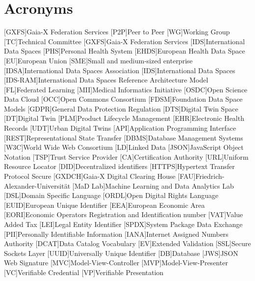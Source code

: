 \chapter{Acronyms}
\begin{acronym}
    [GXFS]{Gaia-X Federation Services}
    [P2P]{Peer to Peer}
    [WG]{Working Group}
    [TC]{Technical Committee}
    [GXFS]{Gaia-X Federation Services}
    [IDS]{International Data Spaces}
    [PHS]{Personal Health System}
    [EHDS]{European Health Data Space}
    [EU]{European Union}
    [SME]{Small and medium-sized enterprise}
    [IDSA]{International Data Spaces Association}
    [IDS]{International Data Spaces}
    [IDS-RAM]{International Data Spaces Reference Architecture Model}
    [FL]{Federated Learning}
    [MII]{Medical Informatics Initiative}
    [OSDC]{Open Science Data Cloud}
    [OCC]{Open Commons Consortium}
    [FDSM]{Foundation Data Space Models}
    [GDPR]{General Data Protection Regulation}
    [DTS]{Digital Twin Space}
    [DT]{Digital Twin}
    [PLM]{Product Lifecycle Management}
    [EHR]{Electronic Health Records}
    [UDT]{Urban Digital Twins}
    [API]{Application Programming Interface}
    [REST]{Representational State Transfer}
    [DBMS]{Database Management Systems}
    [W3C]{World Wide Web Consortium}
    [LD]{Linked Data}
    [JSON]{JavaScript Object Notation}
    [TSP]{Trust Service Provider}
    [CA]{Certification Authority}
    [URL]{Uniform Resource Locator}
    [DID]{Decentralized identifiers}
    [HTTPS]{Hypertext Transfer Protocol Secure}
    [GXDCH]{Gaia-X Digital Clearing House}
    [FAU]{Friedrich-Alexander-Universität}
    [MaD Lab]{Machine Learning and Data Analytics Lab}
    [DSL]{Domain Specific Language}
    [ORDL]{Open Digital Rights Language}
    [EUID]{European Unique Identifier}
    [EEA]{European Economic Area}
    [EORI]{Economic Operators Registration and Identification number}
    [VAT]{Value Added Tax}
    [LEI]{Legal Entity Identifier}
    [SPDX]{System Package Data Exchange}
    [PII]{Personally Identifiable Information}
    [IANA]{Internet Assigned Numbers Authority}
    [DCAT]{Data Catalog Vocabulary}
    [EV]{Extended Validation}
    [SSL]{Secure Sockets Layer}
    [UUID]{Universally Unique Identifier}
    [DB]{Database}
    [JWS]{JSON Web Signature}
    [MVC]{Model-View-Controller}
    [MVP]{Model-View-Presenter}
    [VC]{Verifiable Credential}
    [VP]{Verifiable Presentation}
\end{acronym}%
